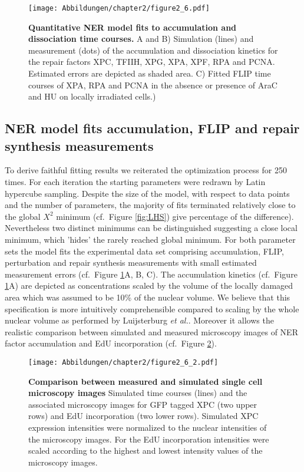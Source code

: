 \begin{figure}[htbp]
\begin{center}
\texttt{[image: Abbildungen/chapter2/figure2\_6.pdf]}
\caption{\textbf{Quantitative NER model fits to accumulation and dissociation time courses.} A and B) Simulation (lines) and measurement (dots) of the accumulation and dissociation kinetics for the repair factors XPC, TFIIH, XPG, XPA, XPF, RPA and PCNA. Estimated errors are depicted as shaded area. C) Fitted FLIP time courses of XPA, RPA and PCNA in the absence or presence of AraC and HU on locally irradiated cells.)}
\label{fig:ModelFit_accu_flip}
\end{center}
\end{figure}

\subsection{NER model fits accumulation, FLIP and repair synthesis measurements}    

To derive faithful fitting results we reiterated the optimization process for 250 times. For each iteration the starting parameters were redrawn by Latin hypercube sampling. Despite the size of the model, with respect to data points and the number of parameters, the majority of fits terminated relatively close to the global $X^2$ minimum (cf.\ Figure \ref{fig:LHS}) give percentage of the difference). Nevertheless two distinct minimums can be distinguished suggesting a close local minimum, which 'hides' the rarely reached global minimum. For both parameter sets the model fits the experimental data set comprising accumulation, FLIP, perturbation and repair synthesis measurements with small estimated measurement errors (cf.\ Figure \ref{fig:ModelFit_accu_flip}A, B, C). The accumulation kinetics (cf.\ Figure \ref{fig:ModelFit_accu_flip}A) are depicted as concentrations scaled by the volume of the locally damaged area which was assumed to be 10\% of the nuclear volume. We believe that this specification is more intuitively comprehensible  compared to scaling by the whole nuclear volume as performed by Luijsterburg \textit{et al.}\cite{Luijsterburg2010}. Moreover it allows the realistic comparison between simulated and measured microscopy images of NER factor accumulation and EdU incorporation (cf.\ Figure \ref{fig:Fitt_accu_Mic}).  

\begin{figure}[htbp]
\begin{center}
\texttt{[image: Abbildungen/chapter2/figure2\_6\_2.pdf]}
\caption{\textbf{Comparison between measured and simulated single cell microscopy images} Simulated time courses (lines) and the associated microscopy images for GFP tagged XPC (two upper rows) and EdU incorporation (two lower rows). Simulated XPC expression intensities were normalized to the nuclear intensities of the microscopy images. For the EdU incorporation intensities were scaled according to the highest and lowest intensity values of the microscopy images.}
\label{fig:Fitt_accu_Mic}
\end{center}
\end{figure}

